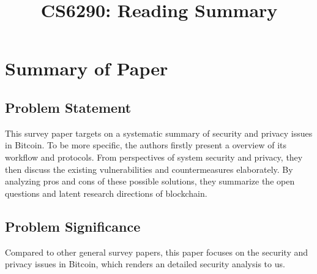 \documentclass[conference]{IEEEtran}
\begin{document}
\title{CS6290: Reading Summary }

\author{
}

\maketitle

\section{Summary of Paper \cite{SongWP00}}


\subsection{Problem Statement}
This survey paper targets on a systematic summary of security and privacy issues in Bitcoin.
%
To be more specific, the authors firstly present a overview of its workflow and protocols. 
%
From perspectives of system security and privacy, they then discuss the existing vulnerabilities and countermeasures elaborately.
%
By analyzing pros and cons of these possible solutions, they summarize the open questions and latent research directions of blockchain.

\subsection{Problem Significance}
Compared to other general survey papers, this paper focuses on the security and privacy issues in Bitcoin, which renders an detailed security analysis to us. 
\end{document}
